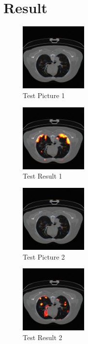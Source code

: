 \documentclass[12pt]{spie}
\begin{document}
\section{Result}

\begin{figure}[H]
  \centering
  \includegraphics[width=0.3\textwidth]{ct01-1.png} 
   \caption{Test Picture 1}
\end{figure}
\begin{figure}[H]
  \centering
  \includegraphics[width=0.3\textwidth]{P1-1.png} 
   \caption{Test Result 1}
\end{figure}

\begin{figure}[H]
  \centering
  \includegraphics[width=0.3\textwidth]{ct01-2.png} 
   \caption{Test Picture 2}
\end{figure}
\begin{figure}[H]
  \centering
  \includegraphics[width=0.3\textwidth]{P1-2.png} 
   \caption{Test Result 2}
\end{figure}
\end{document}
